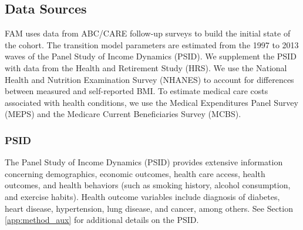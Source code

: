 \subsection{Data Sources} \label{section:data}
\noindent FAM uses data from ABC/CARE follow-up surveys to build the initial state of the cohort. 
The transition model parameters are estimated from the 1997 to 2013 waves of the Panel Study of Income Dynamics (PSID). 
We supplement the PSID with data from the Health and Retirement Study (HRS). We use the National Health and Nutrition Examination Survey (NHANES) 
to account for differences between measured and self-reported BMI.
To estimate medical care costs associated with health conditions, we use the Medical Expenditures Panel Survey (MEPS) and the Medicare Current Beneficiaries Survey (MCBS). \\


\subsubsection{PSID}
\label{section:data_psid}

\noindent The Panel Study  of Income Dynamics (PSID) provides extensive information concerning demographics, economic outcomes, health care access, health outcomes, and health behaviors (such as smoking history, alcohol consumption, and exercise habits). Health outcome variables include diagnosis of diabetes, heart disease, hypertension, lung disease, and cancer, among others. See Section \ref{app:method_aux} for additional details on the PSID. \\

